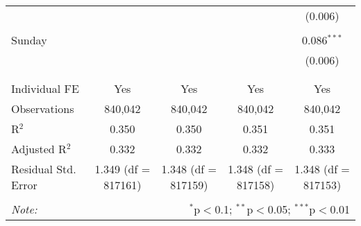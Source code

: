 \documentclass[
]{article}
\begin{document}
\begin{table}[!htbp]
{\begin{tabular}{@{\extracolsep{5pt}}lcccc}
  &  &  &  & (0.006) \\ 
  & & & & \\ 
 Sunday &  &  &  & 0.086$^{***}$ \\ 
  &  &  &  & (0.006) \\ 
  & & & & \\ 
\hline \\[-1.8ex] 
Individual FE & Yes & Yes & Yes & Yes \\ 
Observations & 840,042 & 840,042 & 840,042 & 840,042 \\ 
R$^{2}$ & 0.350 & 0.350 & 0.351 & 0.351 \\ 
Adjusted R$^{2}$ & 0.332 & 0.332 & 0.332 & 0.333 \\ 
Residual Std. Error & 1.349 (df = 817161) & 1.348 (df = 817159) & 1.348 (df = 817158) & 1.348 (df = 817153) \\ 
\hline 
\hline \\[-1.8ex] 
\textit{Note:}  & \multicolumn{4}{r}{$^{*}$p$<$0.1; $^{**}$p$<$0.05; $^{***}$p$<$0.01} \\ 
\end{tabular}
} 
\end{table} 
\newpage
\end{document}
